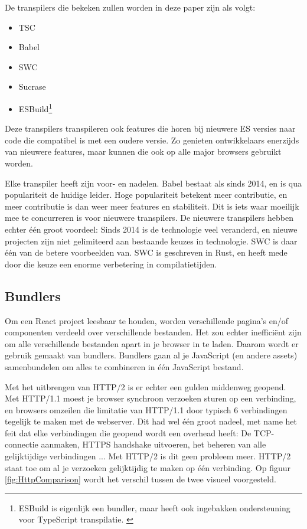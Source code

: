 De transpilers die bekeken zullen worden in deze paper zijn als volgt:

\begin{itemize}
  \item TSC
  \item Babel
  \item SWC
  \item Sucrase
  \item ESBuild\footnote{ESBuild is eigenlijk een bundler, maar heeft ook ingebakken ondersteuning voor TypeScript transpilatie. \autocite{reilly_2021}}
\end{itemize}

Deze transpilers transpileren ook features die horen bij nieuwere ES versies naar code die compatibel is met een oudere versie. Zo genieten ontwikkelaars enerzijds van nieuwere features, maar kunnen die ook op alle major browsers gebruikt worden.

Elke transpiler heeft zijn voor- en nadelen. Babel bestaat als sinds 2014, en is qua populariteit de huidige leider. Hoge populariteit betekent meer contributie, en meer contributie is dan weer meer features en stabiliteit. Dit is iets waar moeilijk mee te concurreren is voor nieuwere transpilers. De nieuwere transpilers hebben echter één groot voordeel: Sinds 2014 is de technologie veel veranderd, en nieuwe projecten zijn niet gelimiteerd aan bestaande keuzes in technologie. SWC is daar één van de betere voorbeelden van. SWC is geschreven in Rust, en heeft mede door die keuze een enorme verbetering in compilatietijden. \autocite{kang_2020, khosravi_2020}

\subsection{Bundlers}

Om een React project leesbaar te houden, worden verschillende pagina's en/of componenten verdeeld over verschillende bestanden. Het zou echter inefficiënt zijn om alle verschillende bestanden apart in je browser in te laden. Daarom wordt er gebruik gemaakt van bundlers. Bundlers gaan al je JavaScript (en andere assets) samenbundelen om alles te combineren in één JavaScript bestand.

Met het uitbrengen van HTTP/2 is er echter een gulden middenweg geopend. Met HTTP/1.1 moest je browser synchroon verzoeken sturen op een verbinding, en browsers omzeilen die limitatie van HTTP/1.1 door typisch 6 verbindingen tegelijk te maken met de webserver. Dit had wel één groot nadeel, met name het feit dat elke verbindingen die geopend wordt een overhead heeft: De TCP-connectie aanmaken, HTTPS handshake uitvoeren, het beheren van alle gelijktijdige verbindingen ... Met HTTP/2 is dit geen probleem meer. HTTP/2 staat toe om al je verzoeken gelijktijdig te maken op één verbinding. \autocite{hsu_2017} Op figuur \ref{fig:HttpComparison} wordt het verschil tussen de twee visueel voorgesteld.

